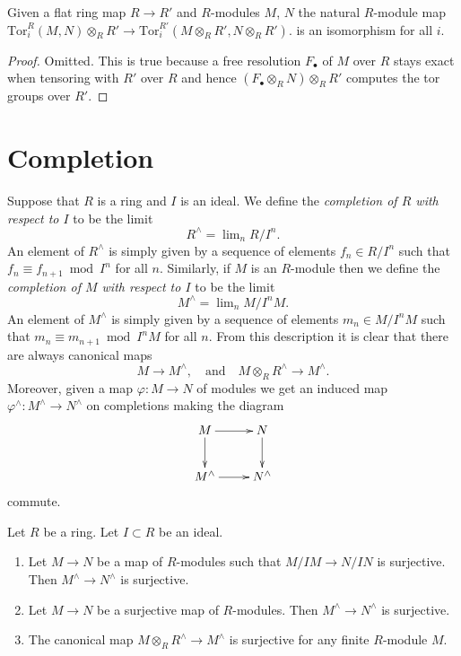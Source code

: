 \begin{lemma}
\label{lemma-flat-base-change-tor}
Given a flat ring map $R \to R'$ and $R$-modules
$M$, $N$ the natural $R$-module map
$\text{Tor}_i^R(M, N)\otimes_R R'
\to \text{Tor}_i^{R'}(M \otimes_R R', N\otimes_R R')$.
is an isomorphism for all $i$.
\end{lemma}

\begin{proof}
Omitted. This is true because a free resolution $F_\bullet$ of $M$ over
$R$ stays exact when tensoring with $R'$ over $R$ and hence
$(F_\bullet \otimes_R N)\otimes_R R'$ computes the tor groups
over $R'$.
\end{proof}


















\section{Completion}
\label{section-completion}

\noindent
Suppose that $R$ is a ring and $I$ is an ideal.
We define the {\it completion of $R$ with respect to $I$}
to be the limit
$$
R^\wedge = \lim\nolimits_{n} R/I^n.
$$
An element of $R^\wedge$ is simply given by a sequence
of elements $f_n \in R/I^n$ such that $f_n \equiv f_{n + 1} \bmod I^n$
for all $n$. Similarly, if $M$ is an $R$-module then we define the
{\it completion of $M$ with respect to $I$}
to be the limit
$$
M^\wedge = \lim\nolimits_{n} M/I^nM.
$$
An element of $M^\wedge$ is simply given by a sequence of
elements $m_n \in M/I^nM$ such that $m_n \equiv m_{n + 1} \bmod I^nM$
for all $n$. From this description it is clear that there
are always canonical maps
$$
M \longrightarrow M^\wedge, \quad\text{and}\quad
M \otimes_R R^\wedge \longrightarrow M^\wedge.
$$
Moreover, given a map $\varphi : M \to N$ of modules we get an induced
map $\varphi^\wedge : M^\wedge \to N^\wedge$ on completions making the
diagram
$$
\xymatrix{
M \ar[r] \ar[d] & N \ar[d] \\
M^\wedge \ar[r] & N^\wedge
}
$$
commute.

\begin{lemma}
\label{lemma-completion-generalities}
Let $R$ be a ring. Let $I \subset R$ be an ideal.
\begin{enumerate}
\item Let $M \to N$ be a map of $R$-modules such that
$M/IM \to N/IN$ is surjective. Then $M^\wedge \to N^\wedge$ is surjective.
\item Let $M \to N$ be a surjective map of $R$-modules. Then
$M^\wedge \to N^\wedge$ is surjective.
\item The canonical map $M \otimes_R R^\wedge \to M^\wedge$ is
surjective for any finite $R$-module $M$.
\end{enumerate}
\end{lemma}

